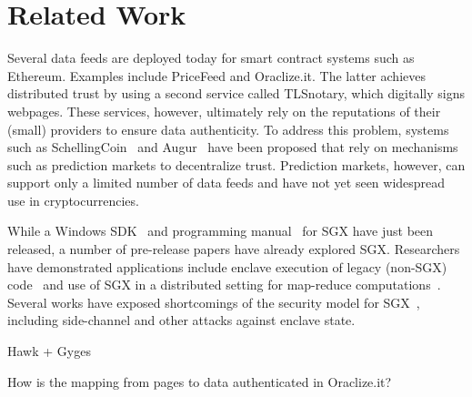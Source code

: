 \section{Related Work}
\label{sec:related}
Several data feeds are deployed today for smart contract systems such as Ethereum. Examples include PriceFeed and Oraclize.it. The latter achieves distributed trust by using a second service called TLSnotary, which digitally signs webpages. These services, however, ultimately rely on the reputations of their (small) providers to ensure data authenticity.  To address this problem, systems such as SchellingCoin~\cite{schellingcoin} and Augur~\cite{augur} have been proposed that rely on mechanisms such as prediction markets to decentralize trust. Prediction markets, however, can support only a limited number of data feeds and have not yet seen widespread use in cryptocurrencies. 

While a Windows SDK~\cite{} and programming manual~\cite{} for SGX have just been released, a number of pre-release papers have already explored SGX. Researchers have demonstrated applications include enclave execution of legacy (non-SGX) code~\cite{Haven} and use of SGX in a distributed setting for map-reduce computations~\cite{vc3}. Several works have exposed shortcomings of the security model for SGX~\cite{sgxexplained,sgxsok,shihardwaretalk}, including side-channel and other attacks against enclave state. 

Hawk + Gyges

How is the mapping from pages to data authenticated in Oraclize.it?
